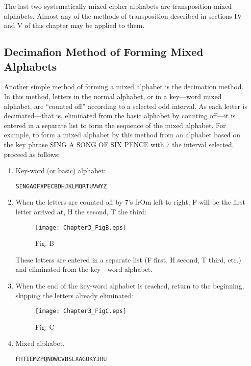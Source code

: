 \mypara The last two systematically mixed cipher alphabets are transposition-mixed alphabets. Almost any of the methods of transposition
described in sections IV and V of this chapter may be applied to them.

\subsection{Decimaﬁon Method of Forming Mixed Alphabets}

Another simple method of forming a mixed alphabet is the decimation
method. In this method, letters in the normal alphabet, or in a key—word
mixed alphabet, are “counted off” according to a selected odd interval.
As each letter is decimated—that is, eliminated from the basic alphabet
by counting off—it is entered in a separate list to form the sequence of
the mixed alphabet. For example, to form a mixed alphabet by this
method from an alphabet based on the key phrase SING A SONG OF
SIX PENCE with 7 the interval selected, proceed as follows:

\begin{enumerate}[label=\alph*]
\item Key-word (or basic) alphabet:

        \begin{verbatim}
SINGAOFXPECBDHJKLMQRTUVWYZ
        \end{verbatim}

\item When the letters are counted off by 7’s frOm left to right, F will
be the first letter arrived at, H the second, T the third:


\begin{figure}[h]
 \centering
 \texttt{[image: Chapter3\_FigB.eps]}
 \caption{Fig. B}
\end{figure}

These letters are entered in a separate list (F ﬁrst, H second, T third,
etc.) and eliminated from the key—word alphabet.

\item When the end of the key-word alphabet is reached, return to the
beginning, skipping the letters already eliminated:
\begin{figure}[h]
 \centering
 \texttt{[image: Chapter3\_FigC.eps]}
 \caption{Fig. C}
\end{figure}

\item Mixed alphabet.

        \begin{verbatim}
FHTIEMZPQNDWCVBSLXAGOKYJRU
        \end{verbatim}
\end{enumerate}


